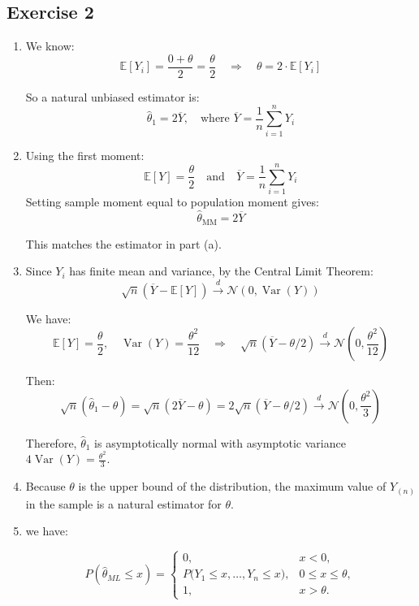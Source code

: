 \documentclass[12pt]{article}
\begin{document}
\begin{flushleft}
\section*{Exercise 2}

\begin{enumerate}[label=(\alph*)]

\item 

We know:
\[
\mathbb{E}[Y_i] = \frac{0 + \theta}{2} = \frac{\theta}{2}
\quad \Rightarrow \quad
\theta = 2 \cdot \mathbb{E}[Y_i]
\]

So a natural unbiased estimator is:
\[
\hat{\theta}_1 = 2 \overline{Y}, \quad \text{where } \overline{Y} = \frac{1}{n} \sum_{i=1}^n Y_i
\]

\item 

Using the first moment:
\[
\mathbb{E}[Y] = \frac{\theta}{2} \quad \text{and} \quad \overline{Y} = \frac{1}{n} \sum_{i=1}^n Y_i
\]
Setting sample moment equal to population moment gives:
\[
\hat{\theta}_{\text{MM}} = 2 \overline{Y}
\]

This matches the estimator in part (a).

\item 

Since \( Y_i \) has finite mean and variance, by the Central Limit Theorem:
\[
\sqrt{n}(\overline{Y} - \mathbb{E}[Y]) \xrightarrow{d} \mathcal{N}\left(0, \operatorname{Var}(Y)\right)
\]

We have:
\[
\mathbb{E}[Y] = \frac{\theta}{2}, \quad \operatorname{Var}(Y) = \frac{\theta^2}{12}
\quad \Rightarrow \quad
\sqrt{n}(\overline{Y} - \theta/2) \xrightarrow{d} \mathcal{N}\left(0, \frac{\theta^2}{12}\right)
\]

Then:
\[
\sqrt{n}(\hat{\theta}_1 - \theta) = \sqrt{n}(2\overline{Y} - \theta) = 2\sqrt{n}(\overline{Y} - \theta/2) \xrightarrow{d} \mathcal{N}\left(0, \frac{\theta^2}{3} \right)
\]

Therefore, \( \hat{\theta}_1 \) is asymptotically normal with asymptotic variance \( 4\operatorname{Var}(Y) = \frac{\theta^2}{3} \).

\item Because $\theta$ is the upper bound of the distribution, the maximum value of $Y_{(n)}$ in the sample is a natural estimator for $\theta$.

\item we have:

\[
P(\hat\theta_{ML} \le x)
= \begin{cases}
0, & x<0,\\[4pt]
\displaystyle P\big(Y_1\le x,\dots,Y_n\le x\big), & 0\le x \le \theta,\\[6pt]
1, & x>\theta.
\end{cases}
\]


\end{enumerate}
\end{flushleft}
\end{document}
